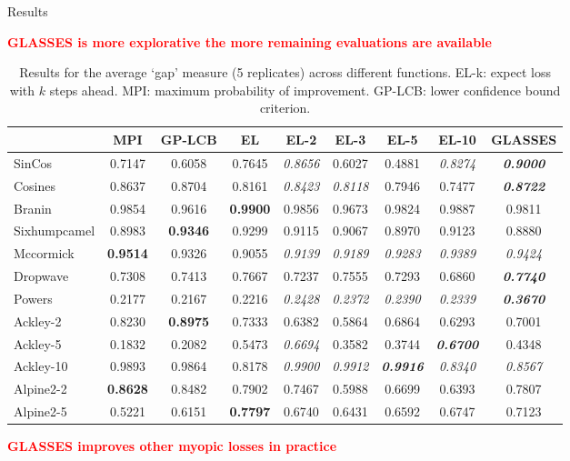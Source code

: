 \documentclass[15pt,serif,mathserif,final]{beamer}
\begin{document}
\begin{frame}{}
\begin{columns}[t]
\begin{column}{0.32\linewidth}
\begin{block}{Results}
 \begin{center}
 \textcolor{red}{\textbf{GLASSES is more explorative the more remaining evaluations are available}}
 \end{center}
 

\begin{table}[t!]
\begin{center}
\begin{tabular}{lcccccccc}
\hline
{} &     MPI &     GP-LCB &      EL &    EL-2 &    EL-3 &    EL-5 &  EL-10 &    GLASSES \\
\hline
SinCos  &  0.7147 &  0.6058 &  0.7645 &  \emph{0.8656} &  0.6027 &  0.4881 &  \emph{0.8274} &  \emph{\textbf{0.9000}} \\ 
Cosines           &  0.8637 &  0.8704 &  0.8161 &  \emph{0.8423} &  \emph{0.8118} &  0.7946 &  0.7477 &  \emph{\textbf{0.8722}} \\
Branin              &  0.9854 &  0.9616 &  \textbf{0.9900} &  0.9856 &  0.9673 &  0.9824 &  0.9887 &  0.9811 \\
Sixhumpcamel        &  0.8983 &  \textbf{0.9346} &  0.9299 &  0.9115 &  0.9067 &  0.8970 &  0.9123 &  0.8880 \\
Mccormick           & \textbf{0.9514} &  0.9326 &  0.9055 &  \emph{0.9139} &  \emph{0.9189} &  \emph{0.9283} &  \emph{0.9389} &  \emph{0.9424} \\
Dropwave            &  0.7308 &  0.7413 &  0.7667 &  0.7237 &  0.7555 &  0.7293 &  0.6860 &  \emph{\textbf{0.7740}} \\
Powers              &  0.2177 &  0.2167 &  0.2216 &  \emph{0.2428} &  \emph{0.2372} &  \emph{0.2390} &  \emph{0.2339} &  \emph{\textbf{0.3670}} \\
Ackley-2 &  0.8230 &  \textbf{0.8975} &  0.7333 &  0.6382 &  0.5864 &  0.6864 &  0.6293 &  0.7001 \\
Ackley-5  & 0.1832&   0.2082&   0.5473&   \emph{0.6694}&  0.3582&   0.3744&   \emph{\textbf{0.6700}} &  0.4348\\ 
Ackley-10 &  0.9893 &  0.9864 &  0.8178 &   \emph{0.9900} &   \emph{0.9912} &   \emph{\textbf{0.9916}} &   \emph{0.8340} &   \emph{0.8567} \\
Alpine2-2 &  \textbf{0.8628} &  0.8482 &  0.7902 &  0.7467 &  0.5988 &  0.6699 &  0.6393 &  0.7807 \\
Alpine2-5  &  0.5221 &  0.6151 &  \textbf{0.7797} &  0.6740 &  0.6431 &  0.6592 &  0.6747 &  0.7123 \\
\hline
\end{tabular}\caption{Results for the average `gap' measure (5 replicates) across different functions.  EL-k: expect loss with $k$ steps ahead. MPI: maximum probability of improvement. GP-LCB: lower confidence bound criterion. }
\end{center}
\end{table}
 \begin{center}
 \textcolor{red}{\textbf{GLASSES improves other myopic losses in practice }}
 \end{center}
 


\end{block}
\end{column}
\end{columns}
\end{frame}
\end{document}

